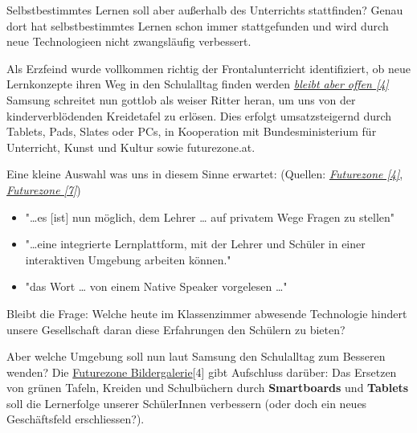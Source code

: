 Selbstbestimmtes Lernen soll aber außerhalb des Unterrichts stattfinden? Genau dort hat selbstbestimmtes Lernen schon immer stattgefunden und wird durch neue Technologieen nicht zwangsläufig verbessert.

Als Erzfeind wurde vollkommen richtig der Frontalunterricht identifiziert, ob neue Lernkonzepte ihren Weg in den Schulalltag finden werden \href{http://futurezone.at/digitallife/14938-gesucht-die-smarte-schule-von-morgen.php}{\textit{bleibt aber offen [4]}}
Samsung schreitet nun gottlob als weiser Ritter heran, um uns von der kinderverblödenden Kreidetafel zu erlösen. Dies erfolgt umsatzsteigernd durch Tablets, Pads, Slates oder PCs, in Kooperation mit Bundesministerium für Unterricht, Kunst und Kultur sowie futurezone.at.

Eine kleine Auswahl was uns in diesem Sinne erwartet: (Quellen: \href{http://futurezone.at/digitallife/14938-gesucht-die-smarte-schule-von-morgen.php}{\textit{Futurezone [4]}},
\href{http://futurezone.at/digitallife/14960-tablet-und-pc-klassen-als-vorzeigeprojekte.php}{\textit{Futurezone [7]}})


\begin{itemize}
  \item "…es [ist] nun möglich, dem Lehrer … auf privatem Wege Fragen zu stellen"
  \item "…eine integrierte Lernplattform, mit der Lehrer und Schüler in einer interaktiven Umgebung arbeiten können."
  \item "das Wort … von einem Native Speaker vorgelesen …"
\end{itemize}

Bleibt die Frage: Welche heute im Klassenzimmer abwesende Technologie hindert unsere Gesellschaft daran diese Erfahrungen den Schülern zu bieten?

Aber welche Umgebung soll nun laut Samsung den Schulalltag zum Besseren wenden?
Die \href{http://futurezone.at/digitallife/14938-gesucht-die-smarte-schule-von-morgen.php}{Futurezone  Bildergalerie}[4] gibt Aufschluss darüber: Das Ersetzen von grünen Tafeln, Kreiden und Schulbüchern durch \textbf{Smartboards} und \textbf{Tablets} soll die Lernerfolge unserer SchülerInnen verbessern (oder doch ein neues Geschäftsfeld erschliessen?).

